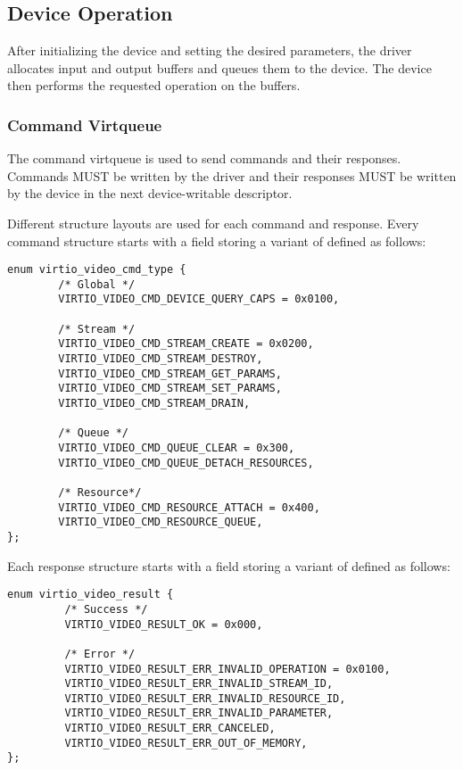 \subsection{Device Operation}
\label{sec:Device Types / Video Device / Device Operation}

After initializing the device and setting the desired parameters,
the driver allocates input and output buffers and queues them
to the device. The device then performs the requested operation on the buffers.

\subsubsection{Command Virtqueue}

The command virtqueue is used to send commands and their responses. Commands
MUST be written by the driver and their responses MUST be written by the device
in the next device-writable descriptor.

Different structure layouts are used for each command and response. Every
command structure starts with a field storing a variant of  defined as follows:
\begin{lstlisting}
enum virtio_video_cmd_type {
        /* Global */
        VIRTIO_VIDEO_CMD_DEVICE_QUERY_CAPS = 0x0100,

        /* Stream */
        VIRTIO_VIDEO_CMD_STREAM_CREATE = 0x0200,
        VIRTIO_VIDEO_CMD_STREAM_DESTROY,
        VIRTIO_VIDEO_CMD_STREAM_GET_PARAMS,
        VIRTIO_VIDEO_CMD_STREAM_SET_PARAMS,
        VIRTIO_VIDEO_CMD_STREAM_DRAIN,

        /* Queue */
        VIRTIO_VIDEO_CMD_QUEUE_CLEAR = 0x300,
        VIRTIO_VIDEO_CMD_QUEUE_DETACH_RESOURCES,

        /* Resource*/
        VIRTIO_VIDEO_CMD_RESOURCE_ATTACH = 0x400,
        VIRTIO_VIDEO_CMD_RESOURCE_QUEUE,
};
\end{lstlisting}

Each response structure starts with a field storing a variant of
 defined as follows:
\begin{lstlisting}
enum virtio_video_result {
         /* Success */
         VIRTIO_VIDEO_RESULT_OK = 0x000,

         /* Error */
         VIRTIO_VIDEO_RESULT_ERR_INVALID_OPERATION = 0x0100,
         VIRTIO_VIDEO_RESULT_ERR_INVALID_STREAM_ID,
         VIRTIO_VIDEO_RESULT_ERR_INVALID_RESOURCE_ID,
         VIRTIO_VIDEO_RESULT_ERR_INVALID_PARAMETER,
         VIRTIO_VIDEO_RESULT_ERR_CANCELED,
         VIRTIO_VIDEO_RESULT_ERR_OUT_OF_MEMORY,
};
\end{lstlisting}

